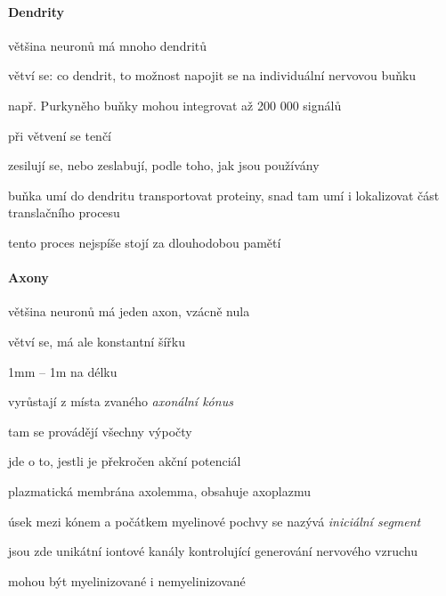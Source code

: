 \documentclass[DIV=8]{scrreprt}
\begin{document}
\paragraph{Dendrity}
\begin{myItemize}[nosep]
    \item většina neuronů má mnoho dendritů
    \item větví se: co dendrit, to možnost napojit se na individuální nervovou buňku
\begin{myItemize}[nosep]
    \item např. Purkyněho buňky mohou integrovat až 200 000 signálů
\end{myItemize}

    \item při větvení se tenčí
    \item zesilují se, nebo zeslabují, podle toho, jak jsou používány
\begin{myItemize}[nosep]
    \item buňka umí do dendritu transportovat proteiny, snad tam umí i lokalizovat část translačního procesu
    \item tento proces nejspíše stojí za dlouhodobou pamětí
\end{myItemize}

\end{myItemize}



\paragraph{Axony}
\begin{myItemize}[nosep]
    \item většina neuronů má jeden axon, vzácně nula
    \item větví se, má ale konstantní šířku
    \item \si{1mm} -- \si{1m} na délku
    \item vyrůstají z místa zvaného \emph{axonální kónus}
\begin{myItemize}[nosep]
    \item tam se provádějí všechny výpočty
    \item jde o to, jestli je překročen akční potenciál
\end{myItemize}

    \item plazmatická membrána axolemma, obsahuje axoplazmu
    \item úsek mezi kónem a počátkem myelinové pochvy se nazývá \emph{iniciální segment}
\begin{myItemize}[nosep]
    \item jsou zde unikátní iontové kanály kontrolující generování nervového vzruchu
\end{myItemize}

    \item mohou být myelinizované i nemyelinizované
\end{myItemize}
\end{document}
